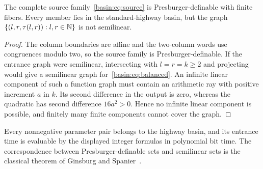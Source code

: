\begin{corollary}\label{basin:cor:nonsemi}
The complete source family~\eqref{basin:eq:source} is Presburger-definable with
finite fibers. Every member lies in the standard-highway basin, but the graph
$\{(l,r,\tau(l,r)):l,r\in\mathbb N\}$ is not semilinear.
\end{corollary}
\begin{proof}
The column boundaries are affine and the two-column words use congruences
modulo two, so the source family is Presburger-definable. If the entrance graph
were semilinear, intersecting with $l=r=k\ge2$ and projecting would give a
semilinear graph for~\eqref{basin:eq:balanced}. An infinite linear component of such
a function graph must contain an arithmetic ray with positive increment $a$
in $k$. Its second difference in the output is zero, whereas the quadratic has
second difference $16a^2>0$. Hence no infinite linear component is possible,
and finitely many finite components cannot cover the graph.
\end{proof}

Every nonnegative parameter pair belongs to the highway basin, and its entrance
time is evaluable by the displayed integer formulas in polynomial bit time.
The correspondence
between Presburger-definable sets and semilinear sets is the classical
theorem of Ginsburg and Spanier~\cite[Theorem~1.3]{gs}.

